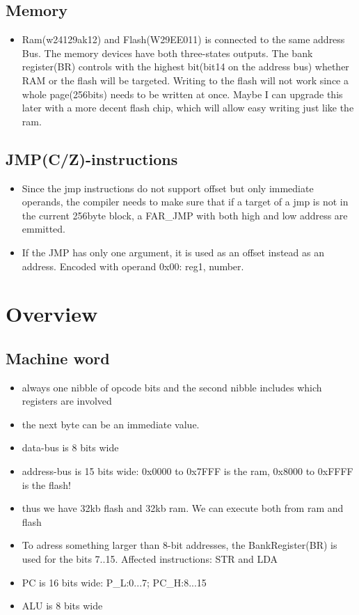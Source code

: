 \documentclass[a4paper, 12pt]{article}
\begin{document}
	\subsection{Memory}
	\begin{itemize}
		\item Ram(w24129ak12) and Flash(W29EE011) is connected to the same address Bus. The memory devices have both three-states outputs. The bank register(BR) controls with the highest bit(bit14 on the address bus) whether RAM or the flash will be targeted. Writing to the flash will not work since a whole page(256bits) needs to be written at once. Maybe I can upgrade this later with a more decent flash chip, which will allow easy writing just like the ram.
	\end{itemize}

	\subsection{JMP(C/Z)-instructions}
	\begin{itemize}
		\item Since the jmp instructions do not support offset but only immediate operands, the compiler needs to make sure that if a target of a jmp is not in the current 256byte block, a FAR\_JMP with both  high and low address are emmitted.
		\item If the JMP has only one argument, it is used as an offset instead as an address. Encoded with operand 0x00: reg1, number.
	\end{itemize}
	\newpage
\section{Overview}
	\subsection {Machine word}
	\begin{itemize}
		\item always one nibble of opcode bits and the second nibble includes which registers are involved
		\item the next byte can be an immediate value.
		\item data-bus is 8 bits wide
		\item address-bus is 15 bits wide: 0x0000 to 0x7FFF is the ram, 0x8000 to 0xFFFF is the flash! 
		\item thus we have 32kb flash and 32kb ram. We can execute both from ram and flash
		\item To adress something larger than 8-bit addresses, the BankRegister(BR) is used for the bits 7..15. Affected instructions: STR and LDA
		\item PC is 16 bits wide: P\_L:0...7; PC\_H:8...15
		\item ALU is 8 bits wide
	\end{itemize}
\end{document}
